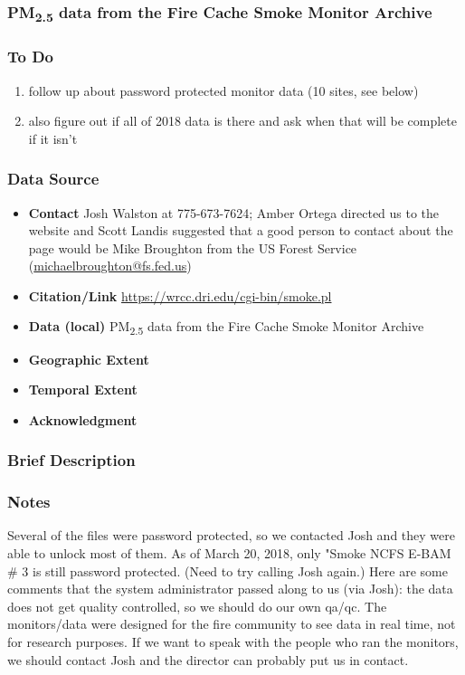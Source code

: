 \clearpage
\subsubsection{\texorpdfstring{PM\textsubscript{2.5}}{} data from the Fire Cache Smoke Monitor Archive}

\subsubsection*{To Do}

\begin{enumerate}
\item follow up about password protected monitor data (10 sites, see below)
\item also figure out if all of 2018 data is there and ask when that will be complete if it isn't
\end{enumerate}

\subsubsection*{Data Source}

\begin{itemize}[nolistsep]
\item \textbf{Contact} Josh Walston at 775-673-7624; Amber Ortega directed us to the website and Scott Landis suggested that a good person to contact about the page would be Mike Broughton from the US Forest Service (\url{michaelbroughton@fs.fed.us})
\item \textbf{Citation/Link} \url{https://wrcc.dri.edu/cgi-bin/smoke.pl}
\item \textbf{Data (local)} PM\textsubscript{2.5} data from the Fire Cache Smoke Monitor Archive
\item \textbf{Geographic Extent}
\item \textbf{Temporal Extent}
\item \textbf{Acknowledgment}
\end{itemize}

\subsubsection*{Brief Description}

\subsubsection*{Notes}

Several of the files were password protected, so we contacted Josh and they were able to unlock most of them. As of March 20, 2018, only "Smoke NCFS E-BAM \# 3 is still password protected. (Need to try calling Josh again.) Here are some comments that the system administrator passed along to us (via Josh): the data does not get quality controlled, so we should do our own qa/qc. The monitors/data were designed for the fire community to see data in real time, not for research purposes. If we want to speak with the people who ran the monitors, we should contact Josh and the director can probably put us in contact.

